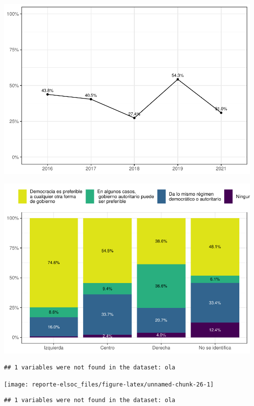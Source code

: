 \documentclass[
  12pt,
]{book}
\begin{document}
\begin{center}\includegraphics{reporte-elsoc_files/figure-latex/unnamed-chunk-24-1} \end{center}

\begin{center}\includegraphics{reporte-elsoc_files/figure-latex/unnamed-chunk-25-1} \end{center}

\begin{verbatim}
## 1 variables were not found in the dataset: ola
\end{verbatim}

\begin{center}\texttt{[image: reporte-elsoc\_files/figure-latex/unnamed-chunk-26-1]} \end{center}

\begin{verbatim}
## 1 variables were not found in the dataset: ola
\end{verbatim}
\end{document}

